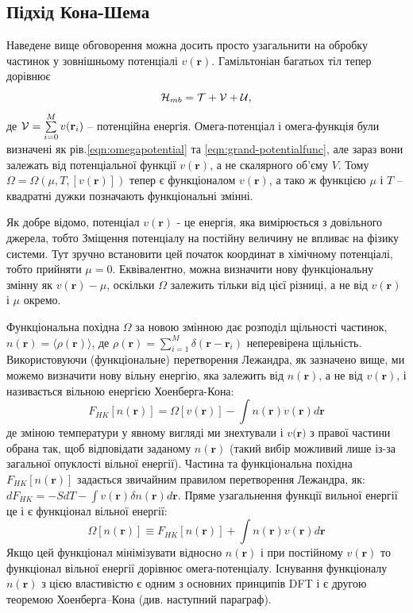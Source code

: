 \subsection{Підхід Кона-Шема}
Наведене вище обговорення можна досить просто узагальнити на обробку частинок у зовнішньому потенціалі $v(\textbf{r})$. Гамільтоніан багатьох тіл тепер дорівнює
\begin{equation}
\label{eqn:Ham}
	{\cal H}_{mb} = {\cal T} +{\cal V} +{\cal U},
\end{equation}
де ${\cal V} = \sum\limits_{i=0}^M v(\textbf{r}_i)$ -- потенційна енергія. Омега-потенціал і омега-функція були визначені як рів.\ref{eqn:omegapotential} та \ref{eqn:grand-potentialfunc}, але зараз вони залежать від потенціальної функції $v(\textbf{r})$, а не скалярного об'єму $V$. Тому $\Omega = \Omega(\mu, T, [v(\textbf{r})])$ тепер є функціоналом $v(\textbf{r})$, а тако ж функцією $\mu$ і $T$ -- квадратні дужки позначають функціональні змінні. 

Як добре відомо, потенціал $v(\textbf{r})$ - це енергія, яка вимірюється з довільного джерела, тобто Зміщення потенціалу на постійну величину не впливає на фізику системи. Тут зручно встановити цей початок координат в хімічному потенціалі, тобто прийняти $\mu = 0$. Еквівалентно, можна визначити нову функціональну змінну як $v(\textbf{r}) - \mu$, оскільки $\Omega$ залежить тільки від цієї різниці, а не від $v(\textbf{r})$ і $\mu$ окремо.

Функціональна похідна $\Omega$ за новою змінною дає розподіл щільності частинок, $n(\textbf{r}) = \langle \rho (\textbf{r}) \rangle$, де $\rho(\textbf{r}) = \sum\limits_{i=1}^M\delta(\textbf{r}-\textbf{r}_i)$ неперевірена щільність. Використовуючи (функціональне) перетворення Лежандра, як зазначено вище, ми можемо визначити нову вільну енергію, яка залежить від $n(\textbf{r})$, а не від $v(\textbf{r})$, і називається вільною енергією Хоенберга-Кона:
\begin{equation}
	\label{eqn:free_energ_hoenberg-khon}
	F_{HK}[n(\textbf{r})] = \Omega[v(\textbf{r})] - \int{n(\textbf{r}) v(\textbf{r})d\textbf{r}} 
\end{equation}
де зміною температури у явному вигляді ми знехтували і $v(\textbf{r)}$ з правої частини обрана так, щоб відповідати заданому $n(\textbf{r})$ (такий вибір можливий лише із-за загальної опуклості вільної енергії). Частина та функціональна похідна $F_{HK}[n(\textbf{r})]$ задається звичайним правилом перетворення Лежандра, як: $dF_{HK} = -SdT - \int{v(\textbf{r})\delta n(\textbf{r})d\textbf{r}}$.
Пряме узагальнення функції вильної енергії це і є функціонал вільної енергії:
\begin{equation}
	\label{eqn:free_energ_functional}
	\Omega[n(\textbf{r})] \equiv F_{HK}[n(\textbf{r})] + \int{n(\textbf{r})v(\textbf{r})d\textbf{r}}
\end{equation}
Якщо цей функціонал мінімізувати відносно $n(\textbf{r})$ і при постійному $v(\textbf{r})$ то функціонал вільної енергії дорівнює омега-потенціалу. Існування функціоналу $n(\textbf{r})$ з цією властивістю є одним з основних принципів DFT і є другою теоремою Хоенберга–Кона (див. наступний параграф).

